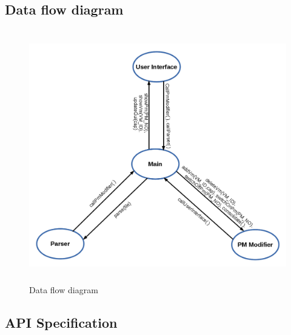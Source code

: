 \documentclass[a4paper,11pt]{article}
\begin{document}
\subsection{Data flow diagram}

\begin{figure}[h]
\centering
\includegraphics[height=11cm]{images/dfd.jpg}
\caption{Data flow diagram}
\label{fig:modules}

\end{figure}

\subsection{API Specification}
\end{document}
